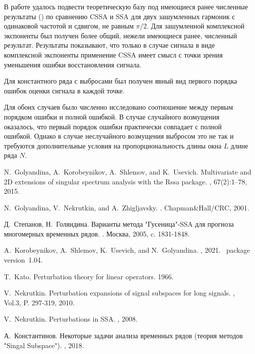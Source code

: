 \documentclass{spisok-article}
\begin{document}
В работе удалось подвести теоретическую базу под имеющиеся ранее численные результаты (\cite{Golyandina.etal2013}) по сравнению CSSA и SSA для двух зашумленных гармоник с одинаковой частотой и сдвигом, не равным $\pi/2$. Для зашумленной комплексной экспоненты был получен более общий, нежели имеющиеся ранее, численный результат.
Результаты показывают, что только в случае сигнала в виде комплексной экспоненты применение CSSA имеет смысл с точки зрения уменьшения ошибки восстановления сигнала.

Для константного ряда с выбросами был получен явный вид первого порядка ошибок оценки сигнала в каждой точке.

Для обоих случаев было численно исследовано соотношение между первым порядком ошибки и полной ошибкой.
В случае случайного возмущения оказалось, что первый порядок ошибки практически совпадает с полной ошибкой. Однако в случае неслучайного возмущения выбросом это не так и требуются дополнительные условия на пропорциональность длины окна $L$ длине ряда $N$.

\renewcommand\refname{Литература}


\begin{thebibliography}{10}

N.~Golyandina, A.~Korobeynikov, A.~Shlemov, and K.~Usevich.
\newblock Multivariate and {2D} extensions of singular spectrum analysis with
  the {R}ssa package.
, 67(2):1--78, 2015.

N.~Golyandina, V.~Nekrutkin, and A.~Zhigljavsky.
.
\newblock Chapman\&Hall/CRC, 2001.

Д.~Степанов, Н.~Голяндина.
\newblock Варианты метода "Гусеница"{-SSA} для прогноза многомерных временных рядов.
. Москва, 2005, c. 1831-1848.

A.~Korobeynikov, A.~Shlemov, K.~Usevich, and N.~Golyandina.
, 2021.
~package version~1.04.

T.~Kato.
\newblock Perturbation theory for linear operators.
 1966.

V.~Nekrutkin.
\newblock Perturbation expansions of signal subspaces for long signals.
, Vol.3, P. 297-319, 2010.

V.~Nekrutkin.
\newblock Perturbations in SSA.
, 2008.

А.~Константинов.
\newblock Некоторые задачи анализа временных рядов (теория методов "Singal Subspace").
, 2018.

\end{thebibliography}
\end{document}
